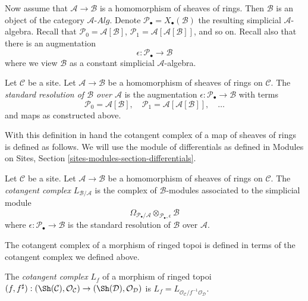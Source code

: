 \medskip\noindent
Now assume that $\mathcal{A} \to \mathcal{B}$ is a homomorphism of sheaves
of rings. Then $\mathcal{B}$ is an object of the category
$\mathcal{A}\textit{-Alg}$. Denote
$\mathcal{P}_\bullet = X_\bullet(\mathcal{B})$ the resulting
simplicial $\mathcal{A}$-algebra.
Recall that
$\mathcal{P}_0 = \mathcal{A}[\mathcal{B}]$,
$\mathcal{P}_1 = \mathcal{A}[\mathcal{A}[\mathcal{B}]]$, and so on.
Recall also that there is an augmentation
$$
\epsilon : \mathcal{P}_\bullet \longrightarrow \mathcal{B}
$$
where we view $\mathcal{B}$ as a constant simplicial $\mathcal{A}$-algebra.

\begin{definition}
\label{definition-standard-resolution-sheaves-rings}
Let $\mathcal{C}$ be a site.
Let $\mathcal{A} \to \mathcal{B}$ be a homomorphism of sheaves of rings
on $\mathcal{C}$. The {\it standard resolution of $\mathcal{B}$ over
$\mathcal{A}$} is the augmentation
$\epsilon : \mathcal{P}_\bullet \to \mathcal{B}$
with terms
$$
\mathcal{P}_0 = \mathcal{A}[\mathcal{B}],\quad
\mathcal{P}_1 = \mathcal{A}[\mathcal{A}[\mathcal{B}]],\quad \ldots
$$
and maps as constructed above.
\end{definition}

\noindent
With this definition in hand the cotangent complex of a map of sheaves
of rings is defined as follows.
We will use the module of differentials as defined in
Modules on Sites, Section \ref{sites-modules-section-differentials}.

\begin{definition}
\label{definition-cotangent-complex-morphism-sheaves-rings}
Let $\mathcal{C}$ be a site.
Let $\mathcal{A} \to \mathcal{B}$ be a homomorphism of sheaves of rings
on $\mathcal{C}$.
The {\it cotangent complex} $L_{\mathcal{B}/\mathcal{A}}$
is the complex of $\mathcal{B}$-modules associated to the
simplicial module
$$
\Omega_{\mathcal{P}_\bullet/\mathcal{A}}
\otimes_{\mathcal{P}_\bullet, \epsilon} \mathcal{B}
$$
where $\epsilon : \mathcal{P}_\bullet \to \mathcal{B}$
is the standard resolution of $\mathcal{B}$ over
$\mathcal{A}$.
\end{definition}

\noindent
The cotangent complex of a morphism of ringed topoi is defined
in terms of the cotangent complex we defined above.

\begin{definition}
\label{definition-cotangent-complex-morphism-ringed-topi}
The {\it cotangent complex} $L_f$ of a morphism of ringed topoi
$(f, f^\sharp) : (\Sh(\mathcal{C}), \mathcal{O}_\mathcal{C}) \to
(\Sh(\mathcal{D}), \mathcal{O}_\mathcal{D})$ is
$L_f = L_{\mathcal{O}_\mathcal{C}/f^{-1}\mathcal{O}_\mathcal{D}}$.
\end{definition}

